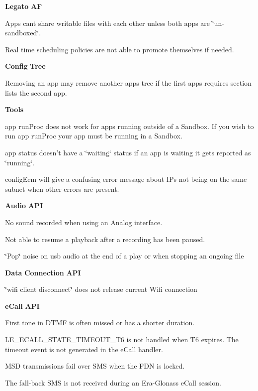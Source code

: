 {\bfseries Legato} {\bfseries AF} 
\begin{DoxyItemize}
\item Apps can\textquotesingle{}t share writable files with each other unless both apps are \char`\"{}un-\/sandboxed\char`\"{}.
\item Real time scheduling policies are not able to promote themselves if needed.
\end{DoxyItemize}

{\bfseries Config} {\bfseries Tree} 
\begin{DoxyItemize}
\item Removing an {\ttfamily app} may remove another {\ttfamily apps} tree if the first {\ttfamily apps} requires section lists the second {\ttfamily app}.
\end{DoxyItemize}

{\bfseries Tools} 
\begin{DoxyItemize}
\item {\ttfamily app} {\ttfamily run\+Proc} does not work for apps running outside of a Sandbox. If you wish to run {\ttfamily app} run\+Proc your {\ttfamily app} must be running in a Sandbox.
\item {\ttfamily app} {\ttfamily status} doesn’t have a \char`\"{}waiting\char`\"{} status if an app is waiting it gets reported as \char`\"{}running\char`\"{}.
\item {\ttfamily config\+Ecm} will give a confusing error message about IP\textquotesingle{}s not being on the same subnet when other errors are present.
\end{DoxyItemize}

{\bfseries Audio} {\bfseries A\+PI} 
\begin{DoxyItemize}
\item No sound recorded when using an Analog interface.
\item Not able to resume a playback after a recording has been paused.
\item \char`\"{}\+Pop\char`\"{} noise on {\ttfamily usb} audio at the end of a play or when stopping an ongoing file
\end{DoxyItemize}

{\bfseries Data} {\bfseries Connection} {\bfseries A\+PI} 
\begin{DoxyItemize}
\item \char`\"{}wifi client disconnect\char`\"{} does not release current Wifi connection
\end{DoxyItemize}

{\bfseries e\+Call} {\bfseries A\+PI} 
\begin{DoxyItemize}
\item First tone in D\+T\+MF is often missed or has a shorter duration.
\item {\ttfamily L\+E\+\_\+\+E\+C\+A\+L\+L\+\_\+\+S\+T\+A\+T\+E\+\_\+\+T\+I\+M\+E\+O\+U\+T\+\_\+\+T6} is not handled when T6 expires. The timeout event is not generated in the e\+Call handler.
\item M\+SD transmissions fail over S\+MS when the F\+DN is locked.
\item The fall-\/back S\+MS is not received during an Era-\/\+Glonass e\+Call session.
\end{DoxyItemize}

